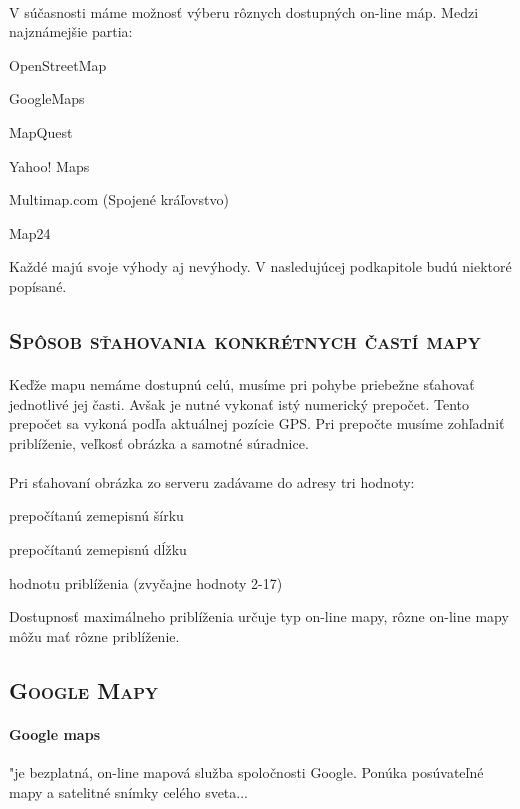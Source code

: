 \paragraph{}
V súčasnosti máme možnosť výberu rôznych dostupných on-line máp. Medzi najznámejšie partia:
\begin{list}{•}
\item OpenStreetMap
\item
\item GoogleMaps
\item MapQuest
\item Yahoo! Maps
\item Multimap.com (Spojené kráľovstvo)
\item Map24
\end{list}

Každé majú svoje výhody aj nevýhody. V nasledujúcej podkapitole budú niektoré popísané.

\subsection{\textsc{Spôsob sťahovania konkrétnych častí mapy}}
\paragraph{}
Keďže mapu nemáme dostupnú celú, musíme pri pohybe priebežne sťahovať jednotlivé jej časti. Avšak je nutné vykonať istý numerický prepočet. Tento prepočet sa vykoná podľa
aktuálnej pozície GPS. Pri prepočte musíme zohľadniť priblíženie, veľkosť
obrázka a samotné súradnice.\\\\
Pri sťahovaní obrázka zo serveru zadávame do adresy tri hodnoty:
\begin{list}{•}
\item prepočítanú zemepisnú šírku
\item
\item prepočítanú zemepisnú dĺžku 
\item hodnotu priblíženia (zvyčajne hodnoty 2-17)
\end{list}

Dostupnosť maximálneho priblíženia určuje typ on-line mapy, rôzne on-line mapy
môžu mať rôzne priblíženie.

\subsection{\textsc{Google Mapy}}
\paragraph{Google maps}
 "je bezplatná, on-line mapová služba spoločnosti Google. Ponúka
posú\-va\-teľ\-né mapy a satelitné snímky celého sveta...

